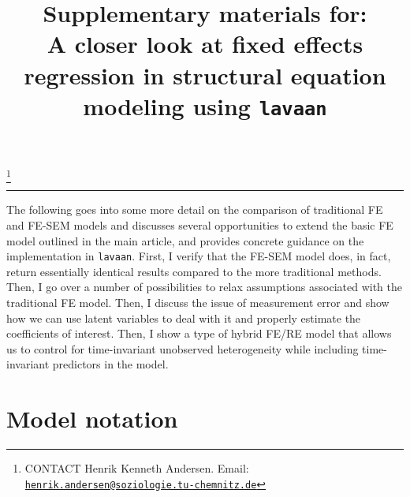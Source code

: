 \documentclass[]{interact}
\theoremstyle{plain}%
\theoremstyle{definition}
\theoremstyle{remark}
\begin{document}
\articletype{}

\title{Supplementary materials for:\\
A closer look at fixed effects regression in structural equation
modeling using \texttt{lavaan}}


\author{
}

\thanks{CONTACT Henrik Kenneth
Andersen. Email: \href{mailto:henrik.andersen@soziologie.tu-chemnitz.de}{\nolinkurl{henrik.andersen@soziologie.tu-chemnitz.de}}}

\maketitle



\singlespacing

\doublespacing

\begin{center}\rule{0.5\linewidth}{0.5pt}\end{center}

The following goes into some more detail on the comparison of
traditional FE and FE-SEM models and discusses several opportunities to
extend the basic FE model outlined in the main article, and provides
concrete guidance on the implementation in \texttt{lavaan}. First, I
verify that the FE-SEM model does, in fact, return essentially identical
results compared to the more traditional methods. Then, I go over a
number of possibilities to relax assumptions associated with the
traditional FE model. Then, I discuss the issue of measurement error and
show how we can use latent variables to deal with it and properly
estimate the coefficients of interest. Then, I show a type of hybrid
FE/RE model that allows us to control for time-invariant unobserved
heterogeneity while including time-invariant predictors in the model.

\hypertarget{model-notation}{%
\section{Model notation}\label{model-notation}}
\end{document}
